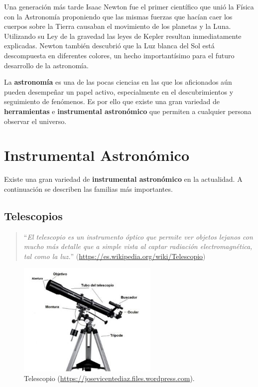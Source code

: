 \bigskip
Una generación más tarde Isaac Newton fue el primer científico que unió la Física con la Astronomía proponiendo que las mismas fuerzas que hacían caer los cuerpos sobre la Tierra causaban el movimiento de los planetas y la Luna. Utilizando su Ley de la gravedad las leyes de Kepler resultan inmediatamente explicadas. Newton también descubrió que la Luz blanca del Sol está descompuesta en diferentes colores, un hecho importantísimo para el futuro desarrollo de la astronomía.

\bigskip
La \textbf{astronomía} es una de las pocas ciencias en las que los aficionados aún pueden desempeñar un papel activo, especialmente en el descubrimientos y seguimiento de fenómenos. Es por ello que existe una gran variedad de \textbf{herramientas} e \textbf{instrumental astronómico} que permiten a cualquier persona observar el universo.

\newpage
\section{Instrumental Astronómico}

Existe una gran variedad de \textbf{instrumental astronómico} en la actualidad. A continuación se describen las familias más importantes.

\subsection{Telescopios}

\begin{quote}``\textit{El telescopio es un instrumento óptico que permite ver objetos lejanos con mucho más detalle que a simple vista al captar radiación electromagnética, tal como la luz.}''
\newline(\url{https://es.wikipedia.org/wiki/Telescopio})
\end{quote}

\begin{figure}[!ht]
  \begin{center}
  \includegraphics[width=0.6\textwidth]{../images/telescopio.jpg}
  \caption{Telescopio (\href{https://josevicentediaz.files.wordpress.com}{https://josevicentediaz.files.wordpress.com}).}
  \label{fig:diag_scrum}
  \end{center}
\end{figure}

